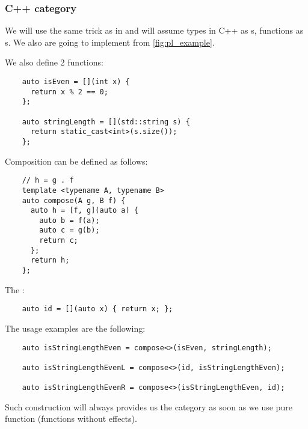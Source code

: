 \subsubsection{\textbf{C++} category}
\begin{example}
  \label{ex:cppcategory}
  We will use the same trick as in  and
  will assume 
  types in C++ as s, 
  functions as s.
  We also are going to implement
   from \cref{fig:pl_example}.


  We  also define 2 functions:
  \begin{verbatim}
    auto isEven = [](int x) { 
      return x % 2 == 0; 
    };

    auto stringLength = [](std::string s) { 
      return static_cast<int>(s.size()); 
    };
  \end{verbatim}

  Composition can be defined as follows:
  \begin{verbatim}
    // h = g . f
    template <typename A, typename B> 
    auto compose(A g, B f) {
      auto h = [f, g](auto a) {
        auto b = f(a);
        auto c = g(b);
        return c;
      };
      return h;
    };
  \end{verbatim}

  The :
  \begin{verbatim}
    auto id = [](auto x) { return x; };
  \end{verbatim}

  The usage examples are the following:
  \begin{verbatim}
    auto isStringLengthEven = compose<>(isEven, stringLength);

    auto isStringLengthEvenL = compose<>(id, isStringLengthEven);

    auto isStringLengthEvenR = compose<>(isStringLengthEven, id);  
  \end{verbatim}

  Such construction will always provides us the category as soon as we
  use pure function (functions without effects).
\end{example}
